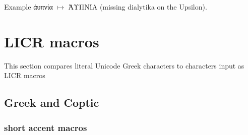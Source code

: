 \documentclass[a4paper]{article}
\begin{document}
Example \foreignlanguage{greek}{ἀυπνία $\mapsto$ \MakeUppercase{ἀυπνία}}
(missing dialytika on the Upsilon).

\section{LICR macros}

This section compares literal Unicode Greek characters to characters input
as LICR macros

\subsection{Greek and Coptic}

\subsubsection{short accent macros}
\end{document}
